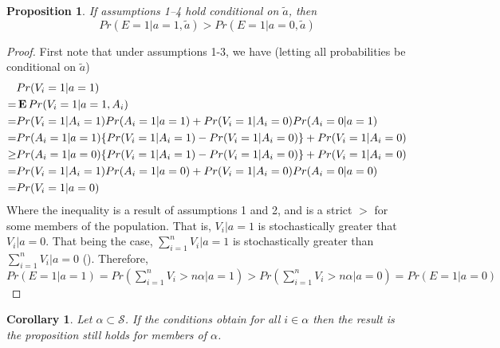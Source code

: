 \documentclass[11pt]{article}
\newcommand{\E}{\mathop{\bf E\/}}
\newtheorem{prop}{Proposition}
\newtheorem{cor}{Corollary}
\begin{document}
\begin{prop}
If assumptions 1--4 hold conditional on $\tilde{a}$, then
\begin{equation}
Pr(E=1|a=1,\tilde{a})>Pr(E=1|a=0,\tilde{a})
\end{equation}
\end{prop}

\begin{proof}
First note that
under assumptions 1-3, we have (letting all probabilities be conditional on $\tilde{a}$)
\begin{align*}
&Pr(V_i=1|a=1)\\
=&\E Pr(V_i=1|a=1,A_i)\\
=&Pr(V_i=1|A_i=1)Pr(A_i=1|a=1)+Pr(V_i=1|A_i=0)Pr(A_i=0|a=1)\\
=&Pr(A_i=1|a=1)\{Pr(V_i=1|A_i=1)-Pr(V_i=1|A_i=0)\}+Pr(V_i=1|A_i=0)\\
\ge&Pr(A_i=1|a=0)\{Pr(V_i=1|A_i=1)-Pr(V_i=1|A_i=0)\}+Pr(V_i=1|A_i=0)\\
=&Pr(V_i=1|A_i=1)Pr(A_i=1|a=0)+Pr(V_i=1|A_i=0)Pr(A_i=0|a=0)\\
=&Pr(V_i=1|a=0)
\end{align*}
Where the inequality is a result of assumptions 1 and 2, and is a strict $>$ for some members of the population.
That is, $V_i|a=1$ is stochastically greater that $V_i|a=0$. That being the case, $\sum_{i=1}^n V_i |a=1$ is stochastically greater than $\sum_{i=1}^n V_i |a=0$ (\citet{shaked2007stochastic}).
Therefore, $Pr(E=1|a=1)=Pr(\sum_{i=1}^n V_i >n\alpha|a=1)>Pr(\sum_{i=1}^n V_i>n\alpha |a=0)=Pr(E=1|a=0)$
\end{proof}

\begin{cor}
Let $\alpha \subset \mathcal{S}$. If the conditions obtain for all $i\in\alpha$ then the result is the proposition still holds for members of $\alpha$.
\end{cor}
\end{document}
